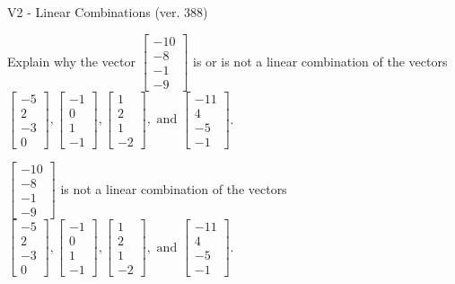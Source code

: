 \begin{exercise}
  \begin{exerciseTitle}V2 - Linear Combinations (ver. 388)\end{exerciseTitle}
  \begin{exerciseStatement}
    Explain why the vector \(\left[\begin{array}{c}
-10 \\
-8 \\
-1 \\
-9
\end{array}\right]\)  is or is not a linear 
	combination of the vectors \(\left[\begin{array}{c}
-5 \\
2 \\
-3 \\
0
\end{array}\right] , \left[\begin{array}{c}
-1 \\
0 \\
1 \\
-1
\end{array}\right] , \left[\begin{array}{c}
1 \\
2 \\
1 \\
-2
\end{array}\right] , \text{ and } \left[\begin{array}{c}
-11 \\
4 \\
-5 \\
-1
\end{array}\right]\).
	


  \end{exerciseStatement}
  \begin{exerciseAnswer}
   \(\left[\begin{array}{c}
-10 \\
-8 \\
-1 \\
-9
\end{array}\right]\) 
  	 is not  
	a linear combination of the vectors \(\left[\begin{array}{c}
-5 \\
2 \\
-3 \\
0
\end{array}\right] , \left[\begin{array}{c}
-1 \\
0 \\
1 \\
-1
\end{array}\right] , \left[\begin{array}{c}
1 \\
2 \\
1 \\
-2
\end{array}\right] , \text{ and } \left[\begin{array}{c}
-11 \\
4 \\
-5 \\
-1
\end{array}\right]\).


\end{exerciseAnswer}
\end{exercise}
